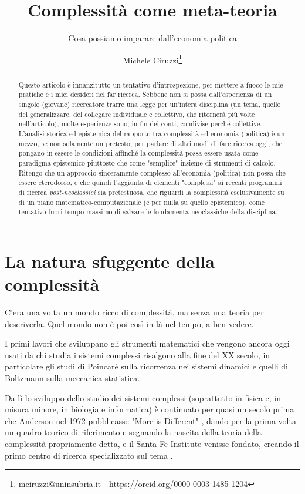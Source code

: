 \documentclass[a4paper, headings=standardclasses]{scrartcl}
\title{Complessità come meta-teoria\let\thefootnote\relax\footnotetext{
		Questa versione è un lavoro preparatiorio per un articolo da presentare alla 2023 INEM Conference. \\
		È a sua volta basata su un precedente lavoro presentato alla 24esima ESHET Summer School. \\
		L'ultima versione disponibile di questo lavoro, insieme a una più concisa versione in inglese, è disponibile online \url{https://github.com/TnTo/complexity-economics/}.
}}
\subtitle{Cosa possiamo imparare dall'economia politica}
\author{Michele Ciruzzi\thanks{mciruzzi@uninsubria.it - \url{https://orcid.org/0000-0003-1485-1204}}}
\begin{document}
\maketitle

\begin{abstract}
	Questo articolo è innanzitutto un tentativo d'introspezione, per mettere a fuoco le mie pratiche e i miei desideri nel far ricerca.
	Sebbene non si possa dall'esperienza di un singolo (giovane) ricercatore trarre una legge per un'intera disciplina (un tema, quello del generalizzare, del collegare individuale e collettivo, che ritornerà più volte nell'articolo), molte esperienze sono, in fin dei conti, condivise perché collettive.
	L'analisi storica ed epistemica del rapporto tra complessità ed economia (politica) è un mezzo, se non solamente un pretesto, per parlare di altri modi di fare ricerca oggi, che pongano in essere le condizioni affinché la complessità possa essere usata come paradigma epistemico piuttosto che come "semplice" insieme di strumenti di calcolo.
	Ritengo che un approccio sinceramente complesso all'economia (politica) non possa che essere eterodosso, e che quindi l'aggiunta di elementi "complessi" ai recenti programmi di ricerca \textit{post-neoclassici} sia pretestuosa, che riguardi la complessità esclusivamente su di un piano matematico-computazionale (e per nulla su quello epistemico), come tentativo fuori tempo massimo di salvare le fondamenta neoclassiche della disciplina.
\end{abstract}

\section{La natura sfuggente della complessità}
C'era una volta un mondo ricco di complessità, ma senza una teoria per descriverla. Quel mondo non è poi così in là nel tempo, a ben vedere.

I primi lavori che sviluppano gli strumenti matematici che vengono ancora oggi usati da chi studia i sistemi complessi risalgono alla fine del XX secolo, in particolare gli studi di Poincaré sulla ricorrenza nei sistemi dinamici e quelli di Boltzmann sulla meccanica statistica.

Da lì lo sviluppo dello studio dei sistemi complessi (soprattutto in fisica e, in misura minore, in biologia e informatica) è continuato per quasi un secolo prima che Anderson nel 1972 pubblicasse "More is Different" \parencite{anderson1972}, dando per la prima volta un quadro teorico di riferimento e segnando la nascita della teoria della complessità propriamente detta, e il Santa Fe Institute venisse fondato, creando il primo centro di ricerca specializzato sul tema \parencite{fontana2010a}.
\end{document}
